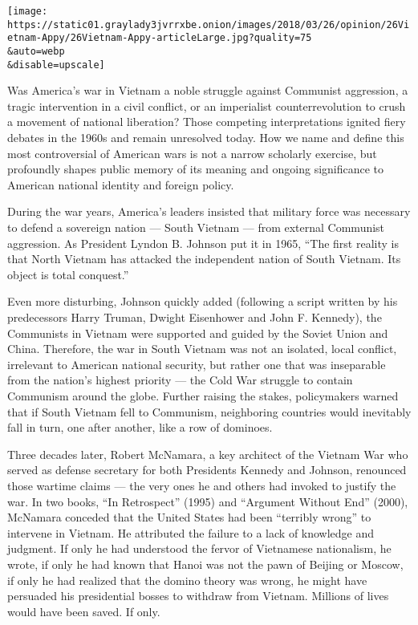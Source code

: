 \texttt{[image: https://static01.graylady3jvrrxbe.onion/images/2018/03/26/opinion/26Vietnam-Appy/26Vietnam-Appy-articleLarge.jpg?quality=75\\\&auto=webp\\\&disable=upscale]}

Was America's war in Vietnam a noble struggle against Communist
aggression, a tragic intervention in a civil conflict, or an imperialist
counterrevolution to crush a movement of national liberation? Those
competing interpretations ignited fiery debates in the 1960s and remain
unresolved today. How we name and define this most controversial of
American wars is not a narrow scholarly exercise, but profoundly shapes
public memory of its meaning and ongoing significance to American
national identity and foreign policy.

During the war years, America's leaders insisted that military force was
necessary to defend a sovereign nation --- South Vietnam --- from
external Communist aggression. As President Lyndon B. Johnson put it in
1965, ``The first reality is that North Vietnam has attacked the
independent nation of South Vietnam. Its object is total conquest.''

Even more disturbing, Johnson quickly added (following a script written
by his predecessors Harry Truman, Dwight Eisenhower and John F.
Kennedy), the Communists in Vietnam were supported and guided by the
Soviet Union and China. Therefore, the war in South Vietnam was not an
isolated, local conflict, irrelevant to American national security, but
rather one that was inseparable from the nation's highest priority ---
the Cold War struggle to contain Communism around the globe. Further
raising the stakes, policymakers warned that if South Vietnam fell to
Communism, neighboring countries would inevitably fall in turn, one
after another, like a row of dominoes.

Three decades later, Robert McNamara, a key architect of the Vietnam War
who served as defense secretary for both Presidents Kennedy and Johnson,
renounced those wartime claims --- the very ones he and others had
invoked to justify the war. In two books, ``In Retrospect'' (1995) and
``Argument Without End'' (2000), McNamara conceded that the United
States had been ``terribly wrong'' to intervene in Vietnam. He
attributed the failure to a lack of knowledge and judgment. If only he
had understood the fervor of Vietnamese nationalism, he wrote, if only
he had known that Hanoi was not the pawn of Beijing or Moscow, if only
he had realized that the domino theory was wrong, he might have
persuaded his presidential bosses to withdraw from Vietnam. Millions of
lives would have been saved. If only.

